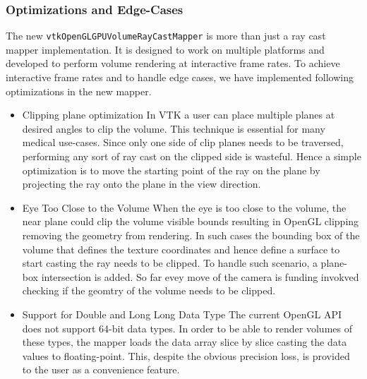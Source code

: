 \subsubsection{Optimizations and Edge-Cases}
The new \texttt{vtkOpenGLGPUVolumeRayCastMapper} is more than just a ray cast mapper implementation. It is designed to work on multiple platforms and developed to perform volume rendering at interactive frame rates. To achieve interactive frame rates and to handle edge cases, we have implemented following optimizations in the new mapper. 

\begin{itemize}
\item Clipping plane optimization 
In VTK a user can place multiple planes at desired angles to clip the volume. This technique is essential for many medical use-cases. Since only one side of clip planes needs to be traversed, performing any sort of ray cast on the clipped side is wasteful. Hence a simple optimization is to move the starting point of the ray on the plane by projecting the ray onto the plane in the view direction. 

\item Eye Too Close to the Volume
When the eye is too close to the volume, the near plane could clip the volume visible bounds resulting in OpenGL clipping removing the geometry from rendering. In such cases the bounding box of the volume that defines the texture coordinates and hence define a surface to start casting the ray needs to be clipped. To handle such scenario, a plane-box intersection is added. So far evey move of the camera is funding invokved checking if the geomtry of the volume needs to be clipped.

\item Support for Double and Long Long Data Type
The current OpenGL API does not support 64-bit data types. In order to be able to render volumes of these types, the mapper loads the data array slice by slice casting the data values to floating-point. This, despite the obvious precision loss, is provided to the user as a convenience feature.

\end{itemize}